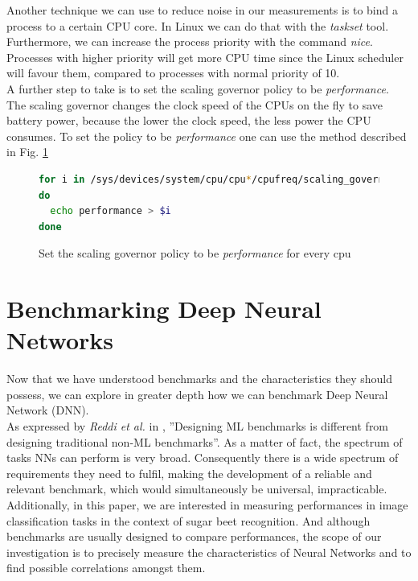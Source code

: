 Another technique we can use to reduce noise in our measurements is to bind a process to a certain CPU core. In Linux we can do that with the \textit{taskset} tool. \cite{LinuxManualWeb}\\
Furthermore, we can increase the process priority with the command \textit{nice}. Processes with higher priority will get more CPU time since the Linux scheduler will favour them, compared to processes with normal priority of 10. \cite{LinuxManualWeb}\\
A further step to take is to set the scaling governor policy to be \textit{performance}. The scaling governor changes the clock speed of the CPUs on the fly to save battery power, because the lower the clock speed, the less power the CPU consumes. To set the policy to be \textit{performance} one can use the method described in Fig. \ref{fig:per_sca}
\begin{figure}[h]
\begin{lstlisting}[language=bash]
for i in /sys/devices/system/cpu/cpu*/cpufreq/scaling_governor
do
  echo performance > $i
done
\end{lstlisting}
\caption{Set the scaling governor policy to be \textit{performance} for every cpu}
\label{fig:per_sca}
\end{figure}



\section{Benchmarking Deep Neural Networks}\label{benchmarking_nn}
Now that we have understood benchmarks and the characteristics they should possess, we can explore in greater depth how we can benchmark Deep Neural Network (DNN).\\
As expressed by \textit{Reddi et al. } in \cite{reddi2020mlperf}, ''Designing ML benchmarks is different from designing traditional non-ML benchmarks''. As a matter of fact, the spectrum of tasks NNs can perform is very broad. Consequently there is a wide spectrum of requirements they need to fulfil, making the development of a reliable and relevant benchmark, which would simultaneously be universal, impracticable. Additionally, in this paper, we are interested in measuring performances in image classification tasks in the context of sugar beet recognition. And although benchmarks are usually designed to compare performances, the scope of our investigation is to precisely measure the characteristics of Neural Networks and to find possible correlations amongst them.



